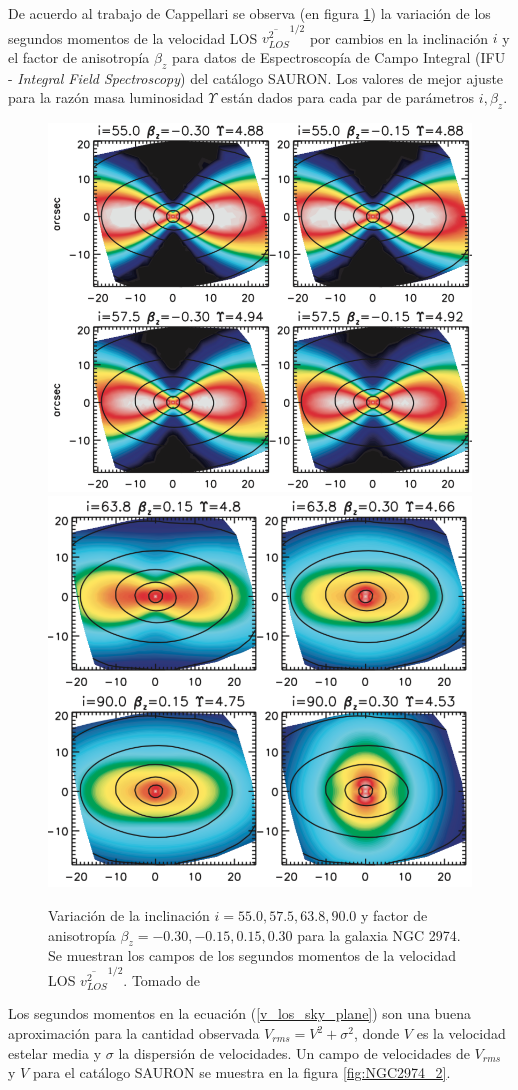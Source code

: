 De acuerdo al trabajo de Cappellari \cite{2008MNRAS.390_71C} se observa (en figura \ref{fig:NGC2974}) la variación de los segundos momentos de la velocidad LOS $\overline{v_{LOS}^2}^{1/2}$  por cambios en la inclinación $i$ y el factor de anisotropía $\beta_z$ para datos de Espectroscopía de Campo Integral (IFU - \emph{Integral Field Spectroscopy}) del catálogo SAURON. Los valores de mejor ajuste para la razón masa luminosidad $\Upsilon$ están dados para cada par de parámetros $i, \beta_z$.\\


\begin{figure}
  \centering
    \includegraphics[width=0.45\columnwidth]{Kap2/NGC2974_1.png}
    \includegraphics[width=0.45\columnwidth]{Kap2/NGC2974_2.png}
  \caption{Variación de la inclinación $i = 55.0, 57.5, 63.8, 90.0$ y factor de anisotropía $\beta_z = -0.30, -0.15, 0.15, 0.30$ para la galaxia NGC 2974. Se muestran los campos de los segundos momentos de la velocidad LOS $\overline{v_{LOS}^2}^{1/2}$. Tomado de \cite{2008MNRAS.390_71C}}
  \label{fig:NGC2974}
\end{figure}

Los segundos momentos en la ecuación (\ref{v_los_sky_plane}) son una buena aproximación para la cantidad observada $V_{rms} = V^2 + \sigma^2$, donde $V$ es la velocidad estelar media y $\sigma$ la dispersión de velocidades. Un campo de velocidades de $V_{rms}$ y $V$ para el catálogo SAURON se muestra en la figura   \ref{fig:NGC2974_2}.

